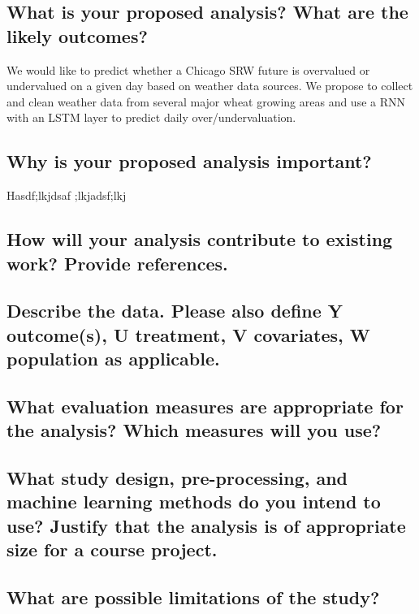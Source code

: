 \documentclass[twoside,11pt]{article}
\begin{document}
\subsection{What is your proposed analysis? What are the likely outcomes?}

We would like to predict whether a Chicago SRW future is overvalued or undervalued on a given day based on weather data sources. We propose to collect and clean weather data from several major wheat growing areas and use a RNN with an LSTM layer to predict daily over/undervaluation.  

\subsection{Why is your proposed analysis important?}

Hasdf;lkjdsaf ;lkjadsf;lkj


\subsection{How will your analysis contribute to existing work? Provide references.}


\subsection{Describe the data. Please also define Y outcome(s), U treatment, V covariates, W population as applicable.}


\subsection{What evaluation measures are appropriate for the analysis? Which measures will you use?}


\subsection{What study design, pre-processing, and machine learning methods do you intend to use? Justify that the analysis is of appropriate size for a course project.}


\subsection{What are possible limitations of the study?}



\end{document}
